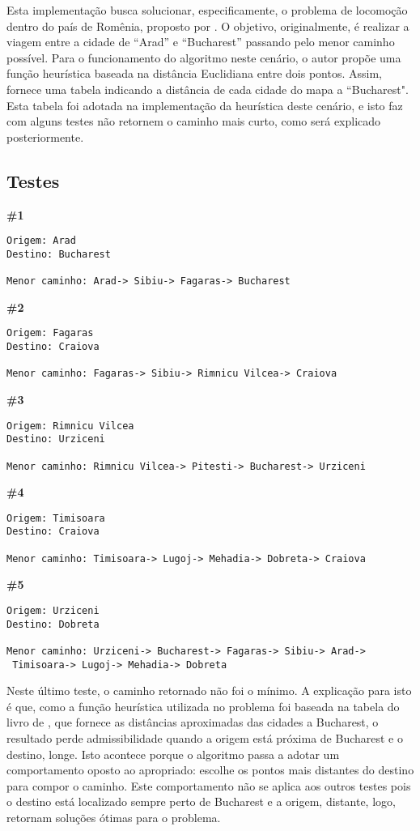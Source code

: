 \documentclass[12pt]{article}
\begin{document}
Esta implementação busca solucionar, especificamente, o problema de locomoção dentro do país de Romênia, proposto por \cite{russel:2010}. O objetivo, originalmente, é realizar a viagem entre a cidade de ``Arad'' e ``Bucharest'' passando pelo menor caminho possível. Para o funcionamento do algoritmo neste cenário, o autor propõe uma função heurística baseada na distância Euclidiana entre dois pontos. Assim, fornece uma tabela indicando a distância de cada cidade do mapa a ``Bucharest". Esta tabela foi adotada na implementação da heurística deste cenário, e isto faz com alguns testes não retornem o caminho mais curto, como será explicado posteriormente.

\subsection{Testes}

\textbf{\#1}
\begin{verbatim}
Origem: Arad
Destino: Bucharest

Menor caminho: Arad-> Sibiu-> Fagaras-> Bucharest
\end{verbatim}
\textbf{\#2}
\begin{verbatim}
Origem: Fagaras
Destino: Craiova

Menor caminho: Fagaras-> Sibiu-> Rimnicu Vilcea-> Craiova
\end{verbatim}
\textbf{\#3}
\begin{verbatim}
Origem: Rimnicu Vilcea
Destino: Urziceni

Menor caminho: Rimnicu Vilcea-> Pitesti-> Bucharest-> Urziceni
\end{verbatim}
\textbf{\#4}
\begin{verbatim}
Origem: Timisoara
Destino: Craiova

Menor caminho: Timisoara-> Lugoj-> Mehadia-> Dobreta-> Craiova
\end{verbatim}
\textbf{\#5}
\begin{verbatim}
Origem: Urziceni
Destino: Dobreta

Menor caminho: Urziceni-> Bucharest-> Fagaras-> Sibiu-> Arad->
 Timisoara-> Lugoj-> Mehadia-> Dobreta
\end{verbatim}

Neste último teste, o caminho retornado não foi o mínimo. A explicação para isto é que, como a função heurística utilizada no problema foi baseada na tabela do livro de \cite{russel:2010}, que fornece as distâncias aproximadas das cidades a Bucharest, o resultado perde admissibilidade quando a origem está próxima de Bucharest e o destino, longe. Isto acontece porque o algoritmo passa a adotar um comportamento oposto ao apropriado: escolhe os pontos mais distantes do destino para compor o caminho. Este comportamento não se aplica aos outros testes pois o destino está localizado sempre perto de Bucharest e a origem, distante, logo, retornam soluções ótimas para o problema.
\end{document}
